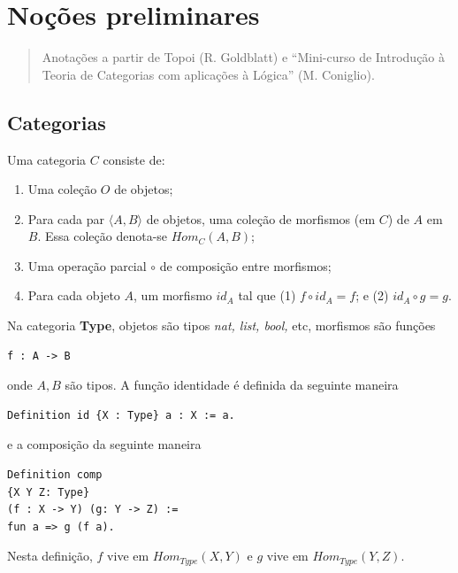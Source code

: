 \hypertarget{nouxe7uxf5es-preliminares}{%
\section{Noções preliminares}\label{nouxe7uxf5es-preliminares}}

\begin{quote}
Anotações a partir de Topoi (R. Goldblatt) e ``Mini-curso de Introdução
à Teoria de Categorias com aplicações à Lógica'' (M. Coniglio).
\end{quote}

\hypertarget{categorias}{%
\subsection{Categorias}\label{categorias}}

Uma categoria \(C\) consiste de:

\begin{enumerate}
\def\labelenumi{\arabic{enumi}.}
\tightlist
\item
  Uma coleção \(O\) de objetos;
\item
  Para cada par \(\langle A, B \rangle\) de objetos, uma coleção de
  morfismos (em \(C\)) de \(A\) em \(B\). Essa coleção denota-se
  \(Hom_C(A,B)\);
\item
  Uma operação parcial \(\circ\) de composição entre morfismos;
\item
  Para cada objeto \(A\), um morfismo \(id_A\) tal que (1)
  \(f \circ id_A = f\); e (2) \(id_A \circ g = g\).
\end{enumerate}

Na categoria \textbf{Type}, objetos são tipos \emph{nat, list, bool,}
etc, morfismos são funções

\begin{verbatim}
f : A -> B
\end{verbatim}

onde \(A, B\) são tipos. A função identidade é definida da seguinte
maneira

\begin{verbatim}
Definition id {X : Type} a : X := a.
\end{verbatim}

e a composição da seguinte maneira

\begin{verbatim}
Definition comp 
{X Y Z: Type} 
(f : X -> Y) (g: Y -> Z) := 
fun a => g (f a).
\end{verbatim}

Nesta definição, \(f\) vive em \(Hom_{Type}(X,Y)\) e \(g\) vive em
\(Hom_{Type}(Y, Z)\).

